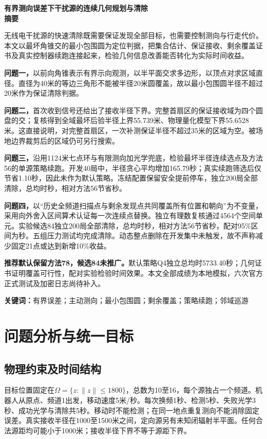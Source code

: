 \documentclass[UTF8,a4paper,zihao=-4,fontset=mac]{ctexart}
\begin{document}
\begin{center}{\bfseries 有界测向误差下干扰源的连续几何规划与清除}\\[8pt]{\large\bfseries 摘\quad 要}\end{center}
无线电干扰源的快速清除既需要保证发现全部目标，也需要控制测向与行走代价。本文以最坏角锥交的最小包围圆为定位判据，把集合估计、保证接收、剩余覆盖证书及真实控制器续跑连接起来，检验几何信息改善能否转化为实际时间收益。

\textbf{问题一，}以前向角锥表示有界示向观测，以半平面交求多边形，以顶点对求区域直径。直径为40米的等边三角形不能被半径20米圆覆盖，故以最小包围圆半径不超过20米作为保证清除判据。

\textbf{问题二，}首次收到信号还给出了接收半径下界。完整首扇区的保证接收域为四个圆盘的交；复核得到全域最坏后验半径上界55.739米、物理量化模型下界55.6528米。这直接说明，对完整首扇区，一次补测保证半径不超过35米的区域为空。被场地边界裁剪后的区域仍可另行搜索。

\textbf{问题三，}沿用1124米七点环与有限测向加光学兜底，检验最坏半径连续选点及方法56的单源策略续跑。开发40局中，半径贪心平均增加165.79秒；真实续跑筛选后仅节省1.10秒，因此未作为默认策略。冻结配置保留安全提前停车，独立200局全部清除，总均时\QthreeMean{}秒，相对方法56节省\QthreeSave{}秒。

\textbf{问题四，}以“历史全频道扫描点与剩余发现点共同覆盖所有位置和朝向”为不变量，采用向外舍入区间算术认证每一次连续点替换。独立有理数复核通过4564个空间单元。实验候选84独立200局全部清除，总均时\QfourMean{}秒，相对方法56节省\QfourSave{}秒，配对95\%区间为\QfourCI{}秒。五组压力测试均完成清除。动态整点删除在开发集中未触发，故不声称减少固定21点或达到新增10\%收益。

\textbf{推荐默认保留方法78，候选84未推广。}默认策略Q4独立总均时5733.40秒；几何证书证明覆盖可行性，配对实验检验时间效果。本文全部成绩为本地模拟，六次官方正式测试及加密日志尚待补入。

\noindent\textbf{关键词：}有界误差；主动测向；最小包围圆；剩余覆盖；策略续跑；邻域巡游
\newpage
\section{问题分析与统一目标}
\subsection{物理约束及时间结构}
目标位置固定在$\Omega=\{z:\|z\|\le1800\}$，总数为10至16，每个源独占一个频道。机器人从原点、频道1出发，移动速度5米/秒。每次换频1秒、检测5秒、失败光学3秒、成功光学与清除共5秒。移动时不能检测；在同一地点重复测向不能消除固定误差。真实接收半径在1000至1500米之间，定向源另有未知闭辐射半平面。任何合法源距均可能小于1000米；接收半径下界不等于源距下界。
\end{document}

